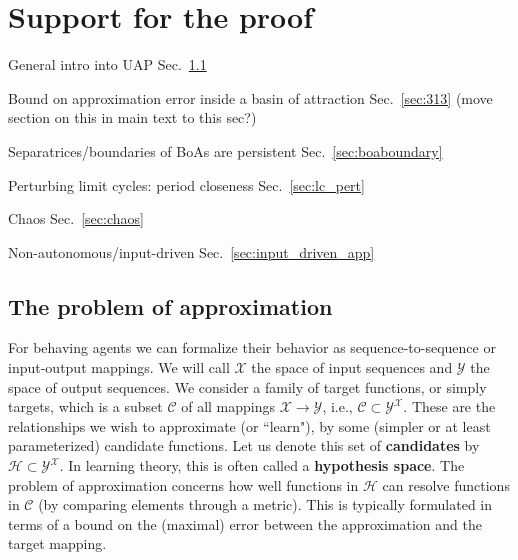 \documentclass{article}
\newcommand{\ascomment}[1]{\textcolor{ascolor}{(#1)}}
\theoremstyle{definition} \newtheorem{definition}{Definition}
\theoremstyle{remark} \newtheorem{remark}{Remark}
\newcounter{ct}
\begin{document}
\newpage
\section{Support for the proof}
General intro into UAP Sec.~\ref{sec:approximationtheory}

Bound on approximation error inside a basin of attraction Sec.~\ref{sec:313} \ascomment{move section on this in main text to this sec?}

Separatrices/boundaries of BoAs are persistent Sec.~\ref{sec:boaboundary}

Perturbing limit cycles: period closeness Sec.~\ref{sec:lc_pert}

Chaos Sec.~\ref{sec:chaos} 

Non-autonomous/input-driven Sec.~\ref{sec:input_driven_app} 

\subsection{The problem of approximation}\label{sec:approximationtheory} %
For behaving agents we can formalize their behavior as sequence-to-sequence or input-output mappings.
We will call $\mathcal{X}$ the space of input sequences and $\mathcal{Y}$ the space of output sequences.
We consider a family of target functions, or simply targets, which is a subset \(\mathcal{C} \) of all mappings \( \mathcal{X} \rightarrow \mathcal{Y} \), i.e., \( \mathcal{C} \subset \mathcal{Y}^\mathcal{X} \). 
These are the relationships we wish to approximate (or ``learn"), by some (simpler or at least parameterized) candidate functions.
Let us denote this set of \textbf{candidates} by \( \mathcal{H} \subset \mathcal{Y}^\mathcal{X} \).
In learning theory, this is often called a \textbf{hypothesis space}.
The problem of approximation concerns how well functions in \( \mathcal{H} \) can resolve functions in \( \mathcal{C} \) (by comparing elements through a metric).
This is typically formulated in terms of a bound on the (maximal) error between the approximation and the target mapping.
\end{document}
